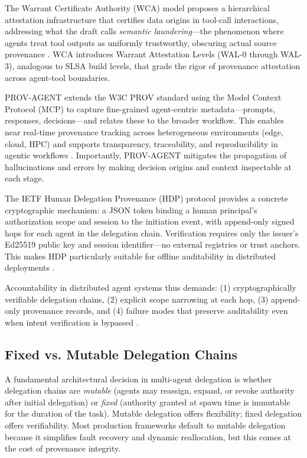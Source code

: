 The Warrant Certificate Authority (WCA) model proposes a hierarchical attestation infrastructure that certifies data origins in tool-call interactions, addressing what the draft calls \emph{semantic laundering}—the phenomenon where agents treat tool outputs as uniformly trustworthy, obscuring actual source provenance \cite{WCA:2026}. WCA introduces Warrant Attestation Levels (WAL-0 through WAL-3), analogous to SLSA build levels, that grade the rigor of provenance attestation across agent-tool boundaries.

PROV-AGENT extends the W3C PROV standard using the Model Context Protocol (MCP) to capture fine-grained agent-centric metadata—prompts, responses, decisions—and relates these to the broader workflow. This enables near real-time provenance tracking across heterogeneous environments (edge, cloud, HPC) and supports transparency, traceability, and reproducibility in agentic workflows \cite{PROVAGENT:2025}. Importantly, PROV-AGENT mitigates the propagation of hallucinations and errors by making decision origins and context inspectable at each stage.

The IETF Human Delegation Provenance (HDP) protocol provides a concrete cryptographic mechanism: a JSON token binding a human principal's authorization scope and session to the initiation event, with append-only signed hops for each agent in the delegation chain. Verification requires only the issuer's Ed25519 public key and session identifier—no external registries or trust anchors. This makes HDP particularly suitable for offline auditability in distributed deployments \cite{HDP:2026}.

Accountability in distributed agent systems thus demands: (1) cryptographically verifiable delegation chains, (2) explicit scope narrowing at each hop, (3) append-only provenance records, and (4) failure modes that preserve auditability even when intent verification is bypassed \cite{SentinelAgent:2026}.


\subsection{Fixed vs. Mutable Delegation Chains}

A fundamental architectural decision in multi-agent delegation is whether delegation chains are \emph{mutable} (agents may reassign, expand, or revoke authority after initial delegation) or \emph{fixed} (authority granted at spawn time is immutable for the duration of the task). Mutable delegation offers flexibility; fixed delegation offers verifiability. Most production frameworks default to mutable delegation because it simplifies fault recovery and dynamic reallocation, but this comes at the cost of provenance integrity.

